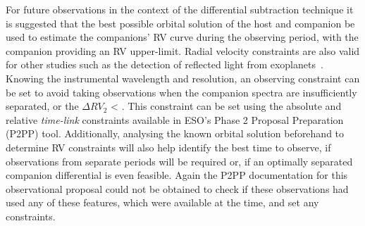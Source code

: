 For future observations in the context of the differential subtraction technique it is suggested that the best possible orbital solution of the host and companion be used to estimate the companions' {RV} curve during the observing period, with the companion \Mtwosini{} providing an {RV} upper-limit.
Radial velocity constraints are also valid for other studies such as the detection of reflected light from exoplanets~\cite[e.g.]{martins_evidence_2015}.
Knowing the instrumental wavelength and resolution, an observing constraint can be set to avoid taking observations when the companion spectra are insufficiently separated, or the \(\Delta {RV}_2\) < {\fwhm}.
This constraint can be set using the absolute and relative \emph{time-link} constraints available in {ESO}'s {Phase 2 Proposal Preparation} (P2PP) tool.
Additionally, analysing the known orbital solution beforehand to determine {RV} constraints will also help identify the best time to observe, if observations from separate periods will be required or, if an optimally separated companion differential is even feasible.
Again the {P2PP} documentation for this observational proposal could not be obtained to check if these observations had used any of these features, which were available at the time, and set any constraints.
